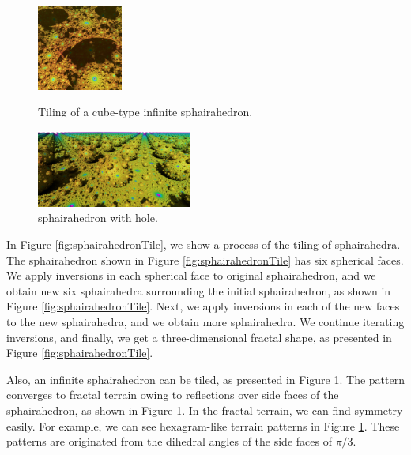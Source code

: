 \documentclass[suppldata, dvipdfmx]{interact}
\theoremstyle{plain}%
\theoremstyle{definition}
\theoremstyle{remark}
\theoremstyle{problemstyle}
\begin{document}
\begin{figure}[h!tbp]
 \hspace*{\fill}
 \begin{minipage}[t]{0.18\textwidth}
  \centering
  \includegraphics[height=1.1in, keepaspectratio]{./img/constructFractal/terrainProcess/final.jpg}
  \label{fig:sphairaPrismFinal}
 \end{minipage}
 \caption{Tiling of a cube-type infinite sphairahedron.}
 \label{fig:sphairahedralPrismTile}
\end{figure}

\begin{figure}[h!tbp]
  \centering
 \includegraphics[width=2in,
 keepaspectratio]{./img/constructFractal/semi-terrain2.png}
 \caption{sphairahedron with hole.}
  \label{fig:semiSphairaSpheres}
\end{figure}

In Figure \ref{fig:sphairahedronTile}, we show a process of the tiling of
sphairahedra.
The sphairahedron shown in Figure
\ref{fig:sphairahedronTile} has six spherical
faces.
We apply inversions in each spherical face to original sphairahedron,
and we obtain new six sphairahedra surrounding the initial sphairahedron,
as shown in Figure
\ref{fig:sphairahedronTile}.
Next, we apply inversions in each of the new faces to the new sphairahedra,
and we obtain more sphairahedra.
We continue iterating inversions, and finally, we get a three-dimensional
fractal shape, as presented in Figure
\ref{fig:sphairahedronTile}.

Also, an infinite sphairahedron can be tiled, as presented in Figure
\ref{fig:sphairahedralPrismTile}.
The pattern converges to fractal terrain owing to reflections over side
faces of the sphairahedron, as shown in Figure 
\ref{fig:sphairahedralPrismTile}.
In the fractal terrain, we can find symmetry easily.
For example, we can see hexagram-like terrain patterns in Figure
\ref{fig:sphairahedralPrismTile}.
These patterns are originated from the dihedral angles of the side faces of
$\pi / 3$.
\end{document}
